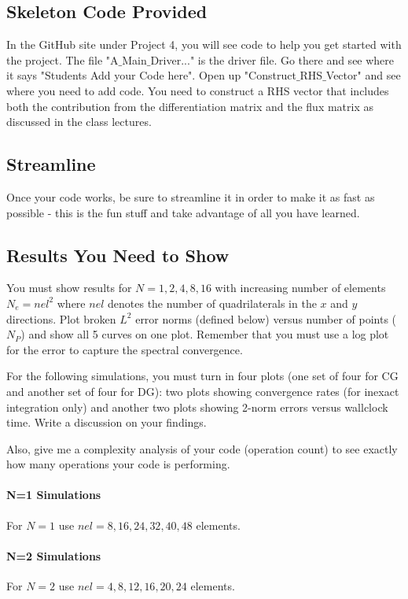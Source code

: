\documentclass[10pt]{article}
\begin{document}
\subsection{Skeleton Code Provided}
In the GitHub site under Project 4, you will see code to help you get started with the project. The file "A$\_$Main$\_$Driver..." is the driver file.  Go there and see where it says "Students Add your Code here".  Open up "Construct$\_$RHS$\_$Vector" and see where you need to add code. You need to construct a RHS vector that includes both the contribution from the differentiation matrix and the flux matrix as discussed in the class lectures. 

\subsection{Streamline}
Once your code works, be sure to streamline it in order to make it as fast as possible - this is the fun stuff and take advantage of all you have learned. 

\subsection{Results You Need to Show}
You must show results for $N=1,2,4,8,16$ with increasing number of elements $N_e=nel^2$ where $nel$ denotes the number of quadrilaterals in 
the $x$ and $y$ directions. 
Plot broken $L^2$ error norms (defined below) versus number of points ($N_P$) and show all 5 curves on one plot. Remember that you must use 
a log plot for the error to capture the spectral convergence. 

For the following simulations, you must turn in four plots (one set of four for CG and another set of four for DG): two plots showing convergence rates (for inexact integration only) and another two plots showing 2-norm errors versus wallclock time. Write a discussion on your findings. 

Also, give me a complexity analysis of your code (operation count) to
see exactly how many operations your code is performing.

\paragraph{N=1 Simulations}
For $N=1$ use $nel=8, 16, 24, 32, 40, 48$ elements.

\paragraph{N=2 Simulations}
For $N=2$ use $nel=4, 8, 12, 16, 20, 24$ elements.
\end{document}
